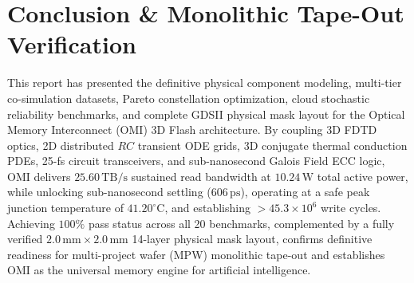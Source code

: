 \documentclass[journal]{IEEEtran}
\begin{document}
\section{Conclusion \& Monolithic Tape-Out Verification}
\label{sec:conclusion}
This report has presented the definitive physical component modeling, multi-tier co-simulation datasets, Pareto constellation optimization, cloud stochastic reliability benchmarks, and complete GDSII physical mask layout for the Optical Memory Interconnect (OMI) 3D Flash architecture. By coupling 3D FDTD optics, 2D distributed $RC$ transient ODE grids, 3D conjugate thermal conduction PDEs, 25-fs circuit transceivers, and sub-nanosecond Galois Field ECC logic, OMI delivers $25.60\,\text{TB/s}$ sustained read bandwidth at $10.24\,\text{W}$ total active power, while unlocking sub-nanosecond settling ($606\,\text{ps}$), operating at a safe peak junction temperature of $41.20^\circ\text{C}$, and establishing $>45.3 \times 10^6$ write cycles. Achieving $100\%$ pass status across all 20 benchmarks, complemented by a fully verified $2.0\,\text{mm} \times 2.0\,\text{mm}$ 14-layer physical mask layout, confirms definitive readiness for multi-project wafer (MPW) monolithic tape-out and establishes OMI as the universal memory engine for artificial intelligence.
\end{document}
